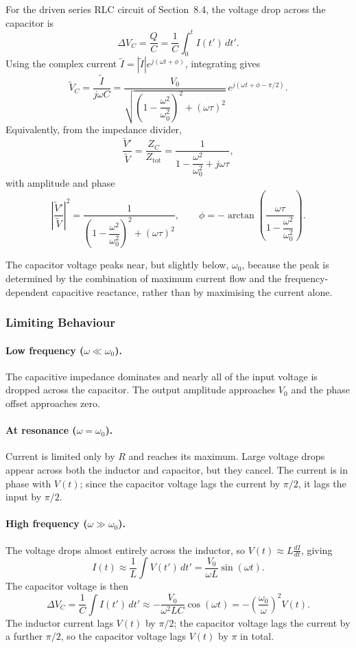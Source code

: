 \documentclass{article}
\begin{document}
For the driven series RLC circuit of Section~8.4, the voltage drop across the capacitor is
\[\Delta V_C = \frac{Q}{C} = \frac{1}{C}\int_0^t I(t')\,dt'.\]
Using the complex current $\tilde{I} = |\tilde{I}|e^{j(\omega t + \phi)}$, integrating gives
\[\tilde{V}_C = \frac{\tilde{I}}{j\omega C} = \frac{V_0}{\sqrt{\left(1 - \dfrac{\omega^2}{\omega_0^2}\right)^2 + (\omega\tau)^2}}\,e^{j(\omega t + \phi - \pi/2)}.\]
Equivalently, from the impedance divider,
\[\frac{\tilde{V}'}{\tilde{V}} = \frac{Z_C}{Z_{\text{tot}}} = \frac{1}{1 - \dfrac{\omega^2}{\omega_0^2} + j\omega\tau},\]
with amplitude and phase
\[\left|\frac{\tilde{V}'}{\tilde{V}}\right|^2 = \frac{1}{\left(1 - \dfrac{\omega^2}{\omega_0^2}\right)^2 + (\omega\tau)^2}, \qquad \phi = -\arctan\!\left(\frac{\omega\tau}{1 - \dfrac{\omega^2}{\omega_0^2}}\right).\]

The capacitor voltage peaks near, but slightly below, $\omega_0$, because the peak is determined by the combination of maximum current flow and the frequency-dependent capacitive reactance, rather than by maximising the current alone.

\subsubsection{Limiting Behaviour}

\paragraph{Low frequency ($\omega \ll \omega_0$).}
The capacitive impedance dominates and nearly all of the input voltage is dropped across the capacitor. The output amplitude approaches $V_0$ and the phase offset approaches zero.

\paragraph{At resonance ($\omega = \omega_0$).}
Current is limited only by $R$ and reaches its maximum. Large voltage drops appear across both the inductor and capacitor, but they cancel. The current is in phase with $V(t)$; since the capacitor voltage lags the current by $\pi/2$, it lags the input by $\pi/2$.

\paragraph{High frequency ($\omega \gg \omega_0$).}
The voltage drops almost entirely across the inductor, so $V(t) \approx L\frac{dI}{dt}$, giving
\[I(t) \approx \frac{1}{L}\int V(t')\,dt' = \frac{V_0}{\omega L}\sin(\omega t).\]
The capacitor voltage is then
\[\Delta V_C = \frac{1}{C}\int I(t')\,dt' \approx -\frac{V_0}{\omega^2 LC}\cos(\omega t) = -\left(\frac{\omega_0}{\omega}\right)^2 V(t).\]
The inductor current lags $V(t)$ by $\pi/2$; the capacitor voltage lags the current by a further $\pi/2$, so the capacitor voltage lags $V(t)$ by $\pi$ in total.
\end{document}
